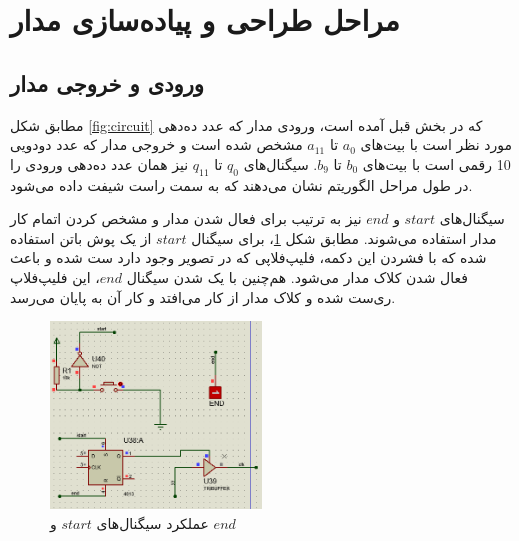 \documentclass[12pt,onecolumn,a4paper,fleqn]{article}
\begin{document}
	\section{مراحل طراحی و پیاده‌سازی مدار}
	\subsection{ورودی و خروجی مدار}
	مطابق شکل \ref{fig:circuit} که در بخش قبل آمده است، ورودی مدار که عدد ده‌دهی مورد نظر است با بیت‌های $a_0$ تا
	$a_{11}$
	مشخص شده است و خروجی مدار که عدد دودویی 10 رقمی است با بیت‌های $b_0$ تا
	$b_{9}$.
	سیگنال‌های $q_0$ تا $q_{11}$ نیز همان عدد ده‌دهی ورودی را در طول مراحل الگوریتم نشان می‌دهند که به سمت راست شیفت داده می‌شود.
	
	سیگنال‌های $start$ و $end$‌ نیز به ترتیب برای فعال شدن مدار و مشخص کردن اتمام کار مدار استفاده می‌شوند. مطابق شکل \ref{fig:start-end}، برای سیگنال $start$ از یک پوش باتن استفاده شده که با فشردن این دکمه، فلیپ‌فلاپی که در تصویر وجود دارد ست شده و باعث فعال شدن کلاک مدار می‌شود. هم‌چنین با یک شدن سیگنال $end$، این فلیپ‌فلاپ ری‌ست شده و کلاک مدار از کار می‌افتد و کار آن به پایان می‌رسد.
	\begin{figure}[H]
		\centering
		\includegraphics[width=0.5\textwidth]{source/start-end.png}
		\caption{عملکرد سیگنال‌های $start$ و $end$}
		\label{fig:start-end}
	\end{figure}
\end{document}
